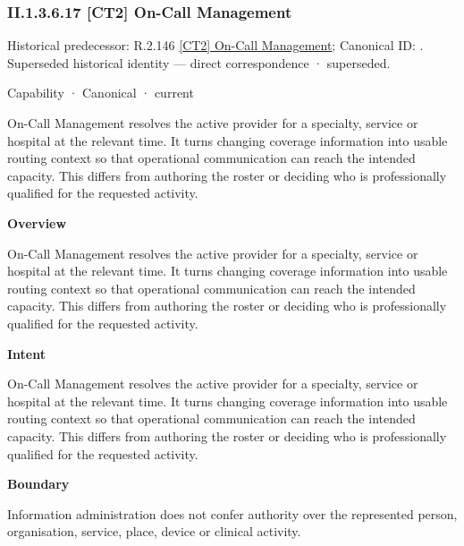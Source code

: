 \subsubsection*{II.1.3.6.17 [CT2] On-Call Management}
\label{navigation:II.1.3.6.17}

{\small Historical predecessor: R.2.146 \hyperref[element:c8e6e66e8718493c9093f37d129f9ff2]{[CT2] On-Call Management}; Canonical ID: \texttt{}. Superseded historical identity — direct correspondence · superseded.}\par
\label{element:b16cef8f2bfd4b92948ec75cbcfa7b9a}
{\small Capability · Canonical · current}\par

On-Call Management resolves the active provider for a specialty, service or hospital at the relevant time. It turns changing coverage information into usable routing context so that operational communication can reach the intended capacity. This differs from authoring the roster or deciding who is professionally qualified for the requested activity.



\textbf{Overview}



On-Call Management resolves the active provider for a specialty, service or hospital at the relevant time. It turns changing coverage information into usable routing context so that operational communication can reach the intended capacity. This differs from authoring the roster or deciding who is professionally qualified for the requested activity.



\textbf{Intent}



On-Call Management resolves the active provider for a specialty, service or hospital at the relevant time. It turns changing coverage information into usable routing context so that operational communication can reach the intended capacity. This differs from authoring the roster or deciding who is professionally qualified for the requested activity.



\textbf{Boundary}



Information administration does not confer authority over the represented person, organisation, service, place, device or clinical activity.



